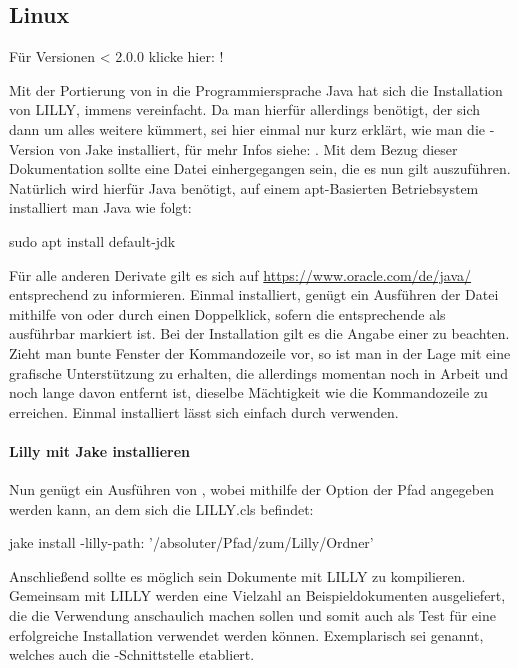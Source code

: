 \subsection{Linux}
\begin{center}
    Für Versionen < 2.0.0 klicke hier: !
\end{center}
Mit der Portierung von \Jake in die Programmiersprache Java hat sich die Installation von LILLY, immens vereinfacht.
Da man hierfür allerdings \Jake benötigt, der sich dann um alles weitere kümmert, sei hier einmal nur kurz erklärt, wie man die -Version von Jake installiert, für mehr Infos siehe: .\newline
Mit dem Bezug dieser Dokumentation sollte eine  Datei einhergegangen sein, die es nun gilt auszuführen. Natürlich wird hierfür Java benötigt, auf einem apt-Basierten Betriebsystem installiert man Java wie folgt:
\begin{bash}
sudo apt install default-jdk
\end{bash}
Für alle anderen Derivate gilt es sich auf \url{https://www.oracle.com/de/java/} entsprechend zu informieren.
Einmal installiert, genügt ein Ausführen der  Datei mithilfe von  oder durch
einen Doppelklick, sofern die entsprechende  als ausführbar markiert ist. Bei der Installation gilt es die Angabe einer  zu beachten.
Zieht man bunte Fenster der Kommandozeile vor, so ist man in der Lage mit \newline{} eine grafische Unterstützung zu erhalten, die allerdings momentan noch in Arbeit und noch lange davon entfernt ist, dieselbe Mächtigkeit wie die Kommandozeile zu erreichen. Einmal installiert lässt sich \Jake einfach durch  verwenden.

\paragraph{Lilly mit Jake installieren}
Nun genügt ein Ausführen von , wobei mithilfe der Option  der Pfad angegeben werden kann, an dem sich die LILLY.cls befindet:
\begin{bash}
jake install -lilly-path: '/absoluter/Pfad/zum/Lilly/Ordner'
\end{bash}
Anschließend sollte es möglich sein Dokumente mit LILLY zu kompilieren. Gemeinsam mit LILLY werden eine Vielzahl an Beispieldokumenten ausgeliefert, die die Verwendung anschaulich machen sollen und somit auch als Test für eine erfolgreiche Installation verwendet werden können.
Exemplarisch sei  genannt, welches auch die -Schnittstelle etabliert.

